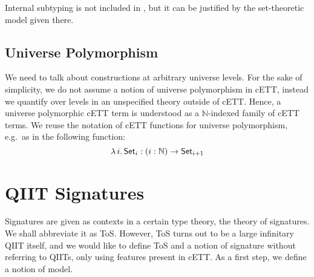 \documentclass[sigplan,review,anonymous]{acmart}\settopmatter{printfolios=true,printccs=false,printacmref=false}
\begin{document}
Internal subtyping is not included in \cite{timany2018cumulative}, but it can be
justified by the set-theoretic model given there.

\subsection{Universe Polymorphism}
\label{sec:universe_polymorphism}

We need to talk about constructions at arbitrary universe levels. For the sake
of simplicity, we do not assume a notion of universe polymorphism in cETT,
instead we quantify over levels in an unspecified theory outside of cETT. Hence,
a universe polymorphic cETT term is understood as a $\mathbb{N}$-indexed family
of cETT terms. We reuse the notation of cETT functions for
universe polymorphism, e.g.\ as in the following function:
\[
\lambda\,i.\,\mathsf{Set}_i : (i : \mathbb{N})\rightarrow \mathsf{Set}_{i+1}
\]

\section{QIIT Signatures}
\label{sec:tos}

Signatures are given as contexts in a certain type theory, the theory of
signatures. We shall abbreviate it as ToS. However, ToS turns out to be a large
infinitary QIIT itself, and we would like to define ToS and a notion of
signature without referring to QIITs, only using features present in cETT. As a
first step, we define a notion of model.
\end{document}

